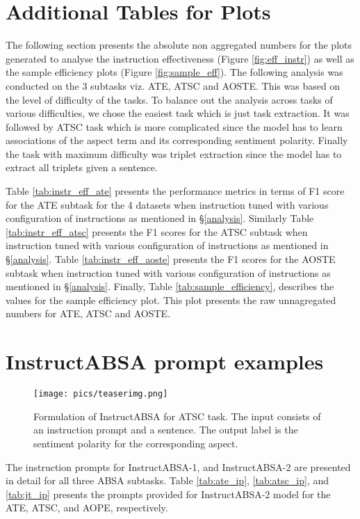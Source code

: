 \documentclass[11pt]{article}
\newcommand{\name}{\textsc{I}nstruct\textsc{ABSA}\xspace}
\begin{document}
\section{Additional Tables for Plots}

The following section presents the absolute non aggregated numbers for the plots generated to analyse the instruction effectiveness (Figure \ref{fig:eff_instr}) as well as the sample efficiency plots (Figure \ref{fig:sample_eff}). 
The following analysis was conducted on the 3 subtasks viz. ATE, ATSC and AOSTE. 
This was based on the level of difficulty of the tasks. 
To balance out the analysis across tasks of various difficulties, we chose the easiest task which is just task extraction. 
It was followed by ATSC task which is more complicated since the model has to learn associations of the aspect term and its corresponding sentiment polarity. 
Finally the task with maximum difficulty was triplet extraction since the model has to extract all triplets given a sentence.

Table \ref{tab:instr_eff_ate} presents the performance metrics in terms of F1 score for the ATE subtask for the 4 datasets when instruction tuned with various configuration of instructions as mentioned in \S \ref{analysis}.
Similarly Table \ref{tab:instr_eff_atsc} presents the F1 scores for the ATSC subtask when instruction tuned with various configuration of instructions as mentioned in \S \ref{analysis}. 
Table \ref{tab:instr_eff_aoste} presents the F1 scores for the AOSTE subtask when instruction tuned with various configuration of instructions as mentioned in \S \ref{analysis}. 
Finally, Table \ref{tab:sample_efficiency}, describes the values for the sample efficiency plot. This plot presents the raw unnagregated numbers for ATE, ATSC and AOSTE.

\section{\name{} prompt examples}
\label{sec:prompt_examples}

 \begin{figure}[t!]
\texttt{[image: pics/teaserimg.png]}
	\caption{Formulation of \name{} for ATSC task. The input consists of an instruction prompt and a sentence. The output label is the sentiment polarity for the corresponding aspect.}
	\label{fig:flowchart}
\end{figure} 

The instruction prompts for \name{}-1, and \name{}-2 are presented in detail for all three ABSA subtasks. 
Table \ref{tab:ate_ip}, \ref{tab:atsc_ip}, and \ref{tab:jt_ip} presents the prompts provided for \name{}-2 model for the ATE, ATSC, and AOPE, respectively. 
\end{document}
